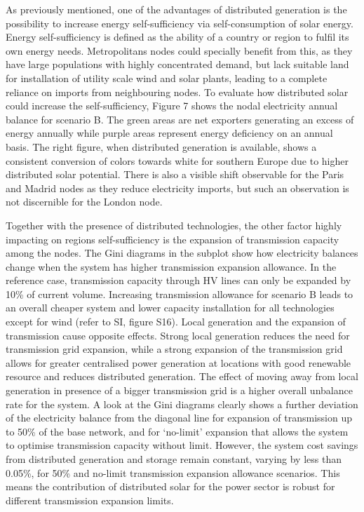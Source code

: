 \documentclass[review]{elsarticle}
\begin{document}
As previously mentioned, one of the advantages of distributed generation is the possibility to increase energy self-sufficiency via self-consumption of solar energy. Energy self-sufficiency is defined as the ability of a country or region to fulfil its own energy needs. Metropolitans nodes could specially benefit from this, as they have large populations with highly concentrated demand, but lack suitable land for installation of utility scale wind and solar plants, leading to a complete reliance on imports from neighbouring nodes. To evaluate how distributed solar could increase the self-sufficiency, Figure 7 shows the nodal electricity annual balance for scenario B. The green areas are net exporters generating an excess of energy annually while purple areas represent energy deficiency on an annual basis. The right figure, when distributed generation is available, shows a consistent conversion of colors towards white for southern Europe due to higher distributed solar potential. There is also a visible shift observable for the Paris and Madrid nodes as they reduce electricity imports, but such an observation is not discernible for the London node.

Together with the presence of distributed technologies, the other factor highly impacting on regions self-sufficiency is the expansion of transmission capacity among the nodes. The Gini diagrams in the subplot show how electricity balances change when the system has higher transmission expansion allowance. In the reference case, transmission capacity through HV lines can only be expanded by 10\% of current volume. Increasing transmission allowance for scenario B leads to an overall cheaper system and lower capacity installation for all technologies except for wind (refer to SI, figure S16). Local generation and the expansion of transmission cause opposite effects. Strong local generation reduces the need for transmission grid expansion, while a strong expansion of the transmission grid allows for greater centralised power generation at locations with good renewable resource and reduces distributed generation. The effect of moving away from local generation in presence of a bigger transmission grid is a higher overall unbalance rate for the system. A look at the Gini diagrams clearly shows a further deviation of the electricity balance from the diagonal line for expansion of transmission up to 50\% of the base network, and for ‘no-limit’ expansion that allows the system to optimise transmission capacity without limit. However, the system cost savings from distributed generation and storage remain constant, varying by less than 0.05\%, for 50\% and no-limit transmission expansion allowance scenarios. This means the contribution of distributed solar for the power sector is robust for different transmission expansion limits. 
\end{document}
